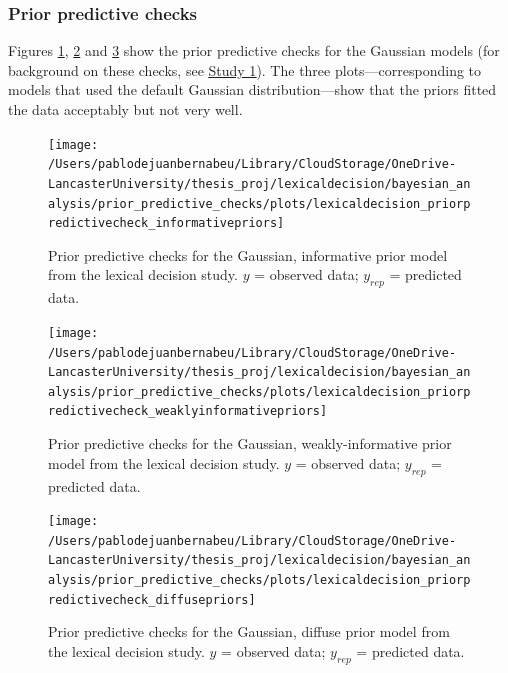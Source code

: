 \documentclass[
  12pt,
  man,floatsintext]{apa7}
\begin{document}
\hypertarget{prior-predictive-checks-2}{%
\subsubsection{Prior predictive checks}\label{prior-predictive-checks-2}}

Figures \ref{fig:lexicaldecision-priorpredictivecheck-informativepriors}, \ref{fig:lexicaldecision-priorpredictivecheck-weaklyinformativepriors} and \ref{fig:lexicaldecision-priorpredictivecheck-diffusepriors} show the prior predictive checks for the Gaussian models (for background on these checks, see \protect\hyperlink{study1-bayesian-diagnostics}{\underline{Study 1}}). The three plots---corresponding to models that used the default Gaussian distribution---show that the priors fitted the data acceptably but not very well.



\begin{figure}

{\centering \texttt{[image: /Users/pablodejuanbernabeu/Library/CloudStorage/OneDrive-LancasterUniversity/thesis\_proj/lexicaldecision/bayesian\_analysis/prior\_predictive\_checks/plots/lexicaldecision\_priorpredictivecheck\_informativepriors]} 

}

\caption{Prior predictive checks for the Gaussian, informative prior model from the lexical decision study. \(y\) = observed data; \(y_{rep}\) = predicted data.}\label{fig:lexicaldecision-priorpredictivecheck-informativepriors}
\end{figure}



\begin{figure}

{\centering \texttt{[image: /Users/pablodejuanbernabeu/Library/CloudStorage/OneDrive-LancasterUniversity/thesis\_proj/lexicaldecision/bayesian\_analysis/prior\_predictive\_checks/plots/lexicaldecision\_priorpredictivecheck\_weaklyinformativepriors]} 

}

\caption{Prior predictive checks for the Gaussian, weakly-informative prior model from the lexical decision study. \(y\) = observed data; \(y_{rep}\) = predicted data.}\label{fig:lexicaldecision-priorpredictivecheck-weaklyinformativepriors}
\end{figure}



\begin{figure}

{\centering \texttt{[image: /Users/pablodejuanbernabeu/Library/CloudStorage/OneDrive-LancasterUniversity/thesis\_proj/lexicaldecision/bayesian\_analysis/prior\_predictive\_checks/plots/lexicaldecision\_priorpredictivecheck\_diffusepriors]} 

}

\caption{Prior predictive checks for the Gaussian, diffuse prior model from the lexical decision study. \(y\) = observed data; \(y_{rep}\) = predicted data.}\label{fig:lexicaldecision-priorpredictivecheck-diffusepriors}
\end{figure}
\end{document}
